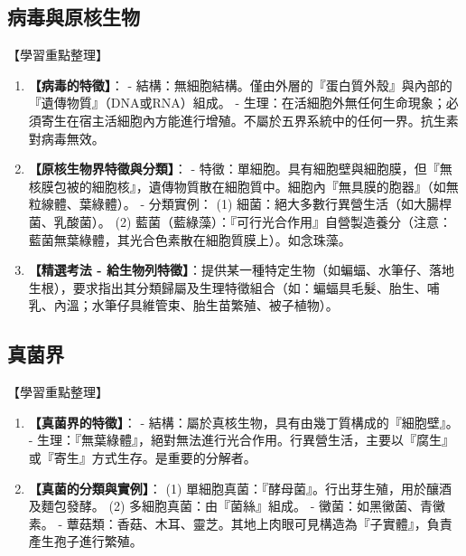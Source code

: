 \documentclass[11pt,a4paper]{article}
\begin{document}
\subsection{病毒與原核生物}
\begin{learningpoints}{【學習重點整理】}
\begin{enumerate}[label=\arabic*.]
  \item \textbf{【病毒的特徵】}：
  - 結構：無細胞結構。僅由外層的『蛋白質外殼』與內部的『遺傳物質』（DNA或RNA）組成。
  - 生理：在活細胞外無任何生命現象；必須寄生在宿主活細胞內方能進行增殖。不屬於五界系統中的任何一界。抗生素對病毒無效。
  \item \textbf{【原核生物界特徵與分類】}：
  - 特徵：單細胞。具有細胞壁與細胞膜，但『無核膜包被的細胞核』，遺傳物質散在細胞質中。細胞內『無具膜的胞器』（如無粒線體、葉綠體）。
  - 分類實例：
    (1) 細菌：絕大多數行異營生活（如大腸桿菌、乳酸菌）。
    (2) 藍菌（藍綠藻）：『可行光合作用』自營製造養分（注意：藍菌無葉綠體，其光合色素散在細胞質膜上）。如念珠藻。
  \item \textbf{【精選考法 - 給生物列特徵】}：提供某一種特定生物（如蝙蝠、水筆仔、落地生根），要求指出其分類歸屬及生理特徵組合（如：蝙蝠具毛髮、胎生、哺乳、內溫；水筆仔具維管束、胎生苗繁殖、被子植物）。
\end{enumerate}
\end{learningpoints}

\subsection{真菌界}
\begin{learningpoints}{【學習重點整理】}
\begin{enumerate}[label=\arabic*.]
  \item \textbf{【真菌界的特徵】}：
  - 結構：屬於真核生物，具有由幾丁質構成的『細胞壁』。
  - 生理：『無葉綠體』，絕對無法進行光合作用。行異營生活，主要以『腐生』或『寄生』方式生存。是重要的分解者。
  \item \textbf{【真菌的分類與實例】}：
  (1) 單細胞真菌：『酵母菌』。行出芽生殖，用於釀酒及麵包發酵。
  (2) 多細胞真菌：由『菌絲』組成。
     - 黴菌：如黑黴菌、青黴素。
     - 蕈菇類：香菇、木耳、靈芝。其地上肉眼可見構造為『子實體』，負責產生孢子進行繁殖。
\end{enumerate}
\end{learningpoints}
\end{document}
